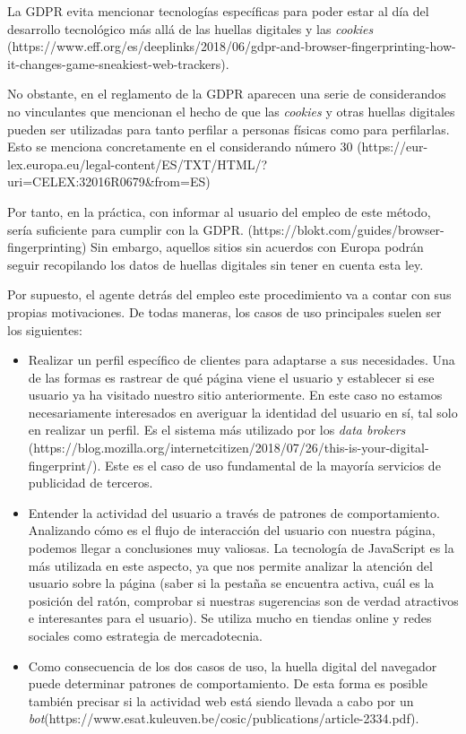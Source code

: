 La GDPR evita mencionar tecnologías específicas para poder estar al día del desarrollo tecnológico más allá de las huellas digitales y las \textit{cookies} (https://www.eff.org/es/deeplinks/2018/06/gdpr-and-browser-fingerprinting-how-it-changes-game-sneakiest-web-trackers). \par 

No obstante, en el reglamento de la GDPR aparecen una serie de considerandos no vinculantes que mencionan el hecho de que las \textit{cookies} y otras huellas digitales pueden ser utilizadas para tanto perfilar a personas físicas como para perfilarlas. Esto se menciona concretamente en el considerando número 30 (https://eur-lex.europa.eu/legal-content/ES/TXT/HTML/?uri=CELEX:32016R0679&from=ES) \par 

Por tanto, en la práctica, con informar al usuario del empleo de este método, sería suficiente para cumplir con la GDPR. (https://blokt.com/guides/browser-fingerprinting) Sin embargo, aquellos sitios sin acuerdos con Europa podrán seguir recopilando los datos de huellas digitales sin tener en cuenta esta ley. \par

Por supuesto, el agente detrás del empleo este procedimiento va a contar con sus propias motivaciones. De todas maneras, los casos de uso principales suelen ser los siguientes: \par

\begin{itemize}
	\item Realizar un perfil específico de clientes para adaptarse a sus necesidades. Una de las formas es rastrear de qué página viene el usuario y establecer si ese usuario ya ha visitado nuestro sitio anteriormente. En este caso no estamos necesariamente interesados en averiguar la identidad del usuario en sí, tal solo en realizar un perfil. Es el sistema más utilizado por los \textit{data brokers} (https://blog.mozilla.org/internetcitizen/2018/07/26/this-is-your-digital-fingerprint/). Este es el caso de uso fundamental de la mayoría servicios de publicidad de terceros.
	
	\item Entender la actividad del usuario a través de patrones de comportamiento. Analizando cómo es el flujo de interacción del usuario con nuestra página, podemos llegar a conclusiones muy valiosas. La tecnología de JavaScript es la más utilizada en este aspecto, ya que nos permite analizar la atención del usuario sobre la página (saber si la pestaña se encuentra activa, cuál es la posición del ratón, comprobar si nuestras sugerencias son de verdad atractivos e interesantes para el usuario). Se utiliza mucho en tiendas online y redes sociales como estrategia de mercadotecnia.
	
	\item Como consecuencia de los dos casos de uso, la huella digital del navegador puede determinar patrones de comportamiento. De esta forma es posible también precisar si la actividad web está siendo llevada a cabo por un \textit{bot}(https://www.esat.kuleuven.be/cosic/publications/article-2334.pdf).
\end{itemize}

